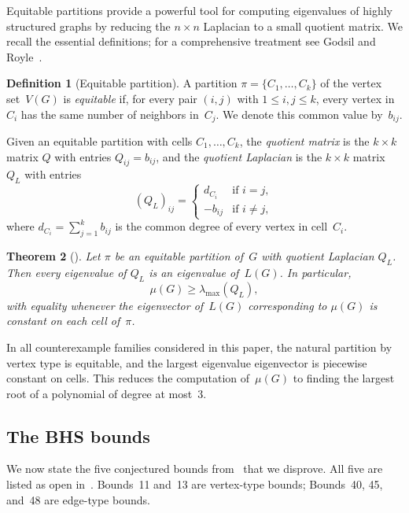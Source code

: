 \documentclass[preprint,12pt]{elsarticle}
\newtheorem{theorem}{Theorem}[section]
\theoremstyle{definition}
\newtheorem{definition}[theorem]{Definition}
\theoremstyle{remark}
\newcommand{\Lspec}{\mu}               %
\begin{document}
Equitable partitions provide a powerful tool for computing eigenvalues
of highly structured graphs by reducing the $n \times n$ Laplacian to a
small quotient matrix. We recall the essential definitions; for a
comprehensive treatment see Godsil and Royle~\cite{GodsilRoyle2001}.

\begin{definition}[Equitable partition]\label{def:equitable}
  A partition $\pi = \{C_1, \ldots, C_k\}$ of the vertex set~$V(G)$ is
  \emph{equitable} if, for every pair $(i,j)$ with
  $1 \leq i, j \leq k$, every vertex in~$C_i$ has the same number of
  neighbors in~$C_j$. We denote this common value by~$b_{ij}$.
\end{definition}

Given an equitable partition with cells $C_1, \ldots, C_k$, the
\emph{quotient matrix} is the $k \times k$ matrix $Q$ with entries
$Q_{ij} = b_{ij}$, and the \emph{quotient Laplacian} is the $k \times k$
matrix $Q_L$ with entries
\[
  (Q_L)_{ij} =
  \begin{cases}
    d_{C_i}  & \text{if } i = j, \\
    -b_{ij}  & \text{if } i \neq j,
  \end{cases}
\]
where $d_{C_i} = \sum_{j=1}^{k} b_{ij}$ is the common degree of every
vertex in cell~$C_i$.

\begin{theorem}[{\cite[Theorem~9.3.3]{GodsilRoyle2001}}]\label{thm:equitable}
  Let $\pi$ be an equitable partition of~$G$ with quotient Laplacian
  $Q_L$. Then every eigenvalue of $Q_L$ is an eigenvalue of~$L(G)$.
  In particular,
  \[
    \Lspec(G) \geq \lambda_{\max}(Q_L),
  \]
  with equality whenever the eigenvector of~$L(G)$ corresponding to
  $\Lspec(G)$ is constant on each cell of~$\pi$.
\end{theorem}

\noindent
In all counterexample families considered in this paper, the natural
partition by vertex type is equitable, and the largest eigenvalue
eigenvector is piecewise constant on cells. This reduces the computation
of~$\Lspec(G)$ to finding the largest root of a polynomial of degree at
most~$3$.

\subsection{The BHS bounds}\label{ssec:bhs-bounds}

We now state the five conjectured bounds from~\cite{BHS2006} that we
disprove. All five are listed as open in~\cite[Table~1]{Ghebleh2024}.
Bounds~11 and~13 are vertex-type bounds; Bounds~40, 45, and~48 are
edge-type bounds.
\end{document}
